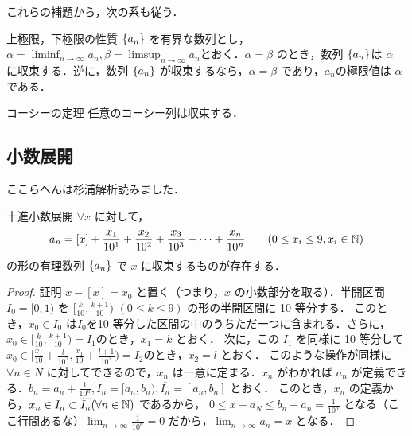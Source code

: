 \documentclass[a4paper]{ltjsarticle}
\begin{document}
  これらの補題から，次の系も従う．

  \begin{corollary}{上極限，下極限の性質}{}
    $\{a_n\}$ を有界な数列とし，$\alpha = \displaystyle \liminf_{n \to \infty} a_n, \beta = \displaystyle \limsup_{n \to \infty} a_n$とおく．$\alpha = \beta$ のとき，数列 $\{a_n\} $は $\alpha$ に収束する．逆に，数列 $\{a_n\}$ が収束するなら，$\alpha = \beta$ であり，${a_n}$の極限値は $\alpha$ である．
  \end{corollary}

  \begin{theorem}{コーシーの定理}{}
   任意のコーシー列は収束する．
  \end{theorem}

  \subsection{小数展開}
  ここらへんは杉浦解析読みました．

  \begin{theorem}{十進小数展開}{}
   $\forall x$ に対して，
   \begin{align}
    \centering
    a_n = [x] + \frac{x_1}{10^1} + \frac{x_2}{10^2} + \frac{x_3}{10^3} + \cdots + \frac{x_n}{10^n} \hspace{20pt} (0 \leq x_i \leq 9, x_i \in \N) 
   \end{align}
の形の有理数列 $\{a_n\}$ で $x$ に収束するものが存在する．
  \end{theorem}
  
  \begin{proof}{証明}{}
   $x - [x] = x_0$ と置く（つまり，$x$ の小数部分を取る）．半開区間 $I_0 = [0, 1)$ を $[\frac{k}{10},\frac{k + 1}{10})$ \hspace{10pt} $(0 \leq k \leq 9)$ の形の半開区間に 10 等分する．
   このとき，$x_0 \in I_0$ は$I_0$を10 等分した区間の中のうちただ一つに含まれる．さらに，$x_0 \in [\frac{k}{10}, \frac{k + 1}{10}) = I_1 のとき，x_1 = k$ とおく．
   次に，この $I_1$ を同様に 10 等分して $x_0 \in [\frac{x_1}{10} + \frac{l}{10^2}, \frac{x_1}{10} + \frac{l + 1}{10^2}) = I_2 のとき，x_2 = l$ とおく．
   このような操作が同様に $\forall n \in N$ に対してできるので，$x_n$ は一意に定まる．$x_n$ がわかれば $a_n$ が定義できる．$b_n = a_n + \frac{1}{10^n}, I_n = [a_n, b_n), \overline{I_n} = [a_n, b_n]$ とおく．
   このとき，$x_n$ の定義から，$x_n \in I_n \subset \overline{I_n} (\forall n \in \mathbb{N})$ であるから，
   $0 \leq x - a_N \leq b_n - a_n = \frac{1}{10^n}$ となる（ここ行間あるな）$\displaystyle \lim_{n \to \infty} \frac{1}{10^n} = 0$ だから，$\displaystyle \lim_{n \to \infty} a_n = x$ となる．
  \end{proof}
\end{document}
